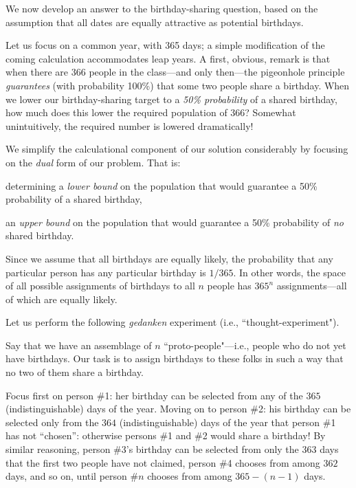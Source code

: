 \bigskip

\noindent
We now develop an answer to the birthday-sharing  question, based on the assumption
that all dates are equally attractive as potential birthdays.

\bigskip

Let us focus on a common year, with 365 days; a simple modification of
the coming calculation accommodates leap years.  A first, obvious,
remark is that when there are 366 people in the class---and only
then---the pigeonhole principle {\em guarantees} (with probability
100\%) that some two people share a birthday.  When we lower our
birthday-sharing target to a {\em 50\% probability} of a shared birthday, how much does
this lower the required population of 366?  Somewhat
unintuitively, the required number is lowered dramatically!

\bigskip

We simplify the calculational component of our solution considerably by focusing on the 
{\em dual}  form of our problem.  That is:

\smallskip

 determining a {\em lower bound} on the population
that would guarantee a 50\% probability of a shared birthday,

 an {\em upper bound} on the population that would
guarantee a 50\% probability of {\em no} shared birthday.

\medskip

Since we assume that all birthdays are equally likely, the probability
that any particular person has any particular birthday is $1/365$.  In
other words, the space of all possible assignments of birthdays to all
$n$ people has $365^n$ assignments---all of which are equally likely.

Let us perform the following {\em gedanken} experiment (i.e., ``thought-experiment").

\smallskip

Say that we have an assemblage of $n$ ``proto-people"---i.e., people who do not yet have  birthdays.
Our task is to assign birthdays to these folks in such a way that no two of them share a birthday.

Focus first on person \#1: her birthday can be selected from any of
the $365$ (indistinguishable) days of the year.  Moving on to person
\#2: his birthday can be selected only from the $364$
(indistinguishable) days of the year that person \#1 has not
``chosen'': otherwise persons \#1 and \#2 would share a birthday!  By
similar reasoning, person \#3's birthday can be selected from only the
$363$ days that the first two people have not claimed, person \#4
chooses from among $362$ days, and so on, until person \#$n$ chooses
from among $365-(n-1)$ days.

